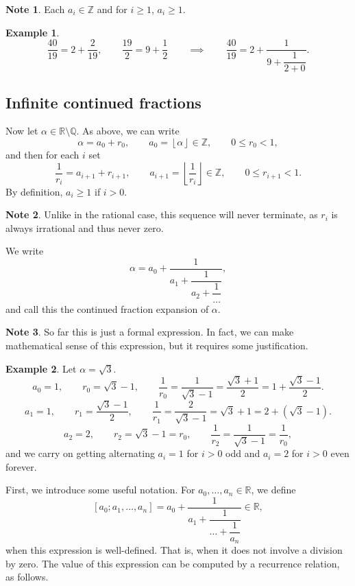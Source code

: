 \documentclass{article}
\newcommand{\Z}{\mathbb{Z}}
\newcommand{\Q}{\mathbb{Q}}
\newcommand{\R}{\mathbb{R}}
\newcommand{\rb}[1]{\left( #1 \right)}
\renewcommand{\sb}[1]{\left[ #1 \right]}
\newcommand{\fb}[1]{\left\lfloor #1 \right\rfloor}
\theoremstyle{definition}\newtheorem{definition}{Definition}
\theoremstyle{definition}\newtheorem{remark}[definition]{Remark}
\theoremstyle{definition}\newtheorem*{example}{Example}
\theoremstyle{definition}\newtheorem*{note}{Note}
\begin{document}
\begin{note}
Each $ a_i \in \Z $ and for $ i \ge 1 $, $ a_i \ge 1 $.
\end{note}

\begin{example}
$$ \dfrac{40}{19} = 2 + \dfrac{2}{19}, \qquad \dfrac{19}{2} = 9 + \dfrac{1}{2} \qquad \implies \qquad \dfrac{40}{19} = 2 + \dfrac{1}{9 + \dfrac{1}{2 + 0}}. $$
\end{example}

\subsection{Infinite continued fractions}

Now let $ \alpha \in \R \setminus \Q $. As above, we can write
$$ \alpha = a_0 + r_0, \qquad a_0 = \fb{\alpha} \in \Z, \qquad 0 \le r_0 < 1, $$
and then for each $ i $ set
$$ \dfrac{1}{r_i} = a_{i + 1} + r_{i + 1}, \qquad a_{i + 1} = \fb{\dfrac{1}{r_i}} \in \Z, \qquad 0 \le r_{i + 1} < 1. $$
By definition, $ a_i \ge 1 $ if $ i > 0 $.

\begin{note}
Unlike in the rational case, this sequence will never terminate, as $ r_i $ is always irrational and thus never zero.
\end{note}

We write
$$ \alpha = a_0 + \dfrac{1}{a_1 + \dfrac{1}{a_2 + \dfrac{1}{\dots}}}, $$
and call this the continued fraction expansion of $ \alpha $.

\begin{note}
So far this is just a formal expression. In fact, we can make mathematical sense of this expression, but it requires some justification.
\end{note}

\begin{example}
Let $ \alpha = \sqrt{3} $.
$$ a_0 = 1, \qquad r_0 = \sqrt{3} - 1, \qquad \dfrac{1}{r_0} = \dfrac{1}{\sqrt{3} - 1} = \dfrac{\sqrt{3} + 1}{2} = 1 + \dfrac{\sqrt{3} - 1}{2}. $$
$$ a_1 = 1, \qquad r_1 = \dfrac{\sqrt{3} - 1}{2}, \qquad \dfrac{1}{r_1} = \dfrac{2}{\sqrt{3} - 1} = \sqrt{3} + 1 = 2 + \rb{\sqrt{3} - 1}. $$
$$ a_2 = 2, \qquad r_2 = \sqrt{3} - 1 = r_0, \qquad \dfrac{1}{r_2} = \dfrac{1}{\sqrt{3} - 1} = \dfrac{1}{r_0}, $$
and we carry on getting alternating $ a_i = 1 $ for $ i > 0 $ odd and $ a_i = 2 $ for $ i > 0 $ even forever.
\end{example}

First, we introduce some useful notation. For $ a_0, \dots, a_n \in \R $, we define
$$ \sb{a_0; a_1, \dots, a_n} = a_0 + \dfrac{1}{a_1 + \dfrac{1}{\dots + \dfrac{1}{a_n}}} \in \R, $$
when this expression is well-defined. That is, when it does not involve a division by zero. The value of this expression can be computed by a recurrence relation, as follows.
\end{document}
